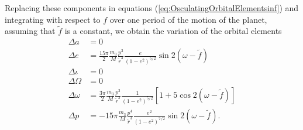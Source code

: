 

Replacing these components in equations (\ref{eq:OsculatingOrbitalElementsinf}) and integrating with respect to $f$ over one period of the motion of the planet, assuming that $\tilde{f}$ is a constant, we obtain the variation of the orbital elements
\begin{subequations}\label{eq:PerihelionShiftOrbitalElements}
\begin{align}
\Delta a &= 0 \\ 
\Delta e &= \frac{15 \pi}{2}\frac{m_3}{M} \frac{p^3}{\tilde{r}^3} \frac{e}{(1-e^2)^{5/2}}  \sin 2 (\omega - \tilde{f}) \\
\Delta \iota &= 0 \\
\Delta \Omega &= 0 \\ 
\Delta \omega &=  \frac{3 \pi}{2} \frac{m_3}{M} \frac{p^3}{\tilde{r}^3} \frac{1}{(1-e^2)^{5/2}} \left[ 1 + 5\cos  2 (\omega - \tilde{f})\right] \\
\Delta p &= -15 \pi \frac{m_3}{M} \frac{p^4}{\tilde{r}^3} \frac{e^2}{(1-e^2)^{7/2}} \sin 2(\omega - \tilde{f}).
\end{align}
\end{subequations}

